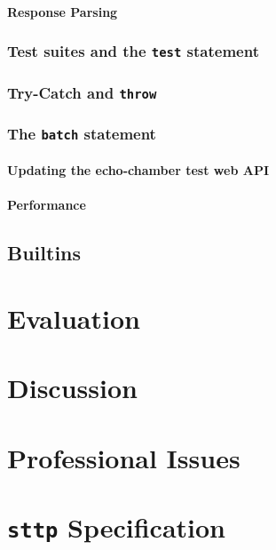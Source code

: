 \documentclass[]{full}
\theoremstyle{definition}
\begin{document}
\subsubsection{Response Parsing}

\cprotect\subsection{Test suites and the \verb|test| statement}

\cprotect\subsection{Try-Catch and \verb|throw|}

\cprotect\subsection{The \verb|batch| statement}

\subsubsection{Updating the echo-chamber test web API}

\subsubsection{Performance}

\section{Builtins}

\chapter{Evaluation}
\label{chap:evaluation}

\chapter{Discussion}
\label{chap:discussion}

\chapter{Professional Issues}
\label{chap:professional-issues}


\appendix

\cprotect\chapter{\verb|sttp| Specification}
\label{appendix:sttp-specification}
\end{document}
